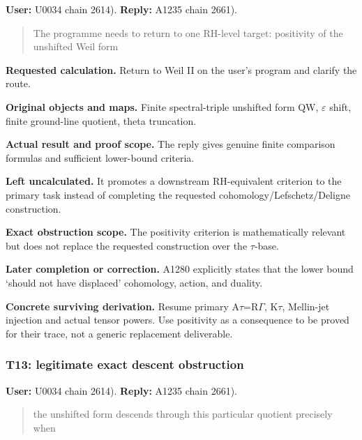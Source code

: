 \textbf{User:} U0034
\protect{} chain 2614).
\textbf{Reply:} A1235
\protect{} chain 2661).

\begin{quote}
The programme needs to return to one RH-level target: positivity of the
unshifted Weil form
\end{quote}

\textbf{Requested calculation.} Return to Weil II on the user's program
and clarify the route.

\textbf{Original objects and maps.} Finite spectral-triple unshifted
form QW, \allowbreak{}\ensuremath{ε}\allowbreak{} shift, finite
ground-line quotient, theta truncation.

\textbf{Actual result and proof scope.} The reply gives genuine finite
comparison formulas and sufficient lower-bound criteria.

\textbf{Left uncalculated.} It promotes a downstream RH-equivalent
criterion to the primary task instead of completing the requested
cohomology/Lefschetz/Deligne construction.

\textbf{Exact obstruction scope.} The positivity criterion is
mathematically relevant but does not replace the requested construction
over the \allowbreak{}\ensuremath{τ}\allowbreak{}-base.

\textbf{Later completion or correction.} A1280 explicitly states that
the lower bound `should not have displaced' cohomology, action, and
duality.

\textbf{Concrete surviving derivation.} Resume primary
A\allowbreak{}\ensuremath{τ}\allowbreak{}=R\allowbreak{}\ensuremath{Γ}\allowbreak{},
K\allowbreak{}\ensuremath{τ}\allowbreak{}, Mellin-jet injection and
actual tensor powers. Use positivity as a consequence to be proved for
their trace, not a generic replacement deliverable.

\subsubsection{T13: legitimate exact descent
obstruction}\label{TranscriptLedgerStage:t13-legitimate-exact-descent-obstruction}

\textbf{User:} U0034
\protect{} chain 2614).
\textbf{Reply:} A1235
\protect{} chain 2661).

\begin{quote}
the unshifted form descends through this particular quotient precisely
when
\end{quote}


